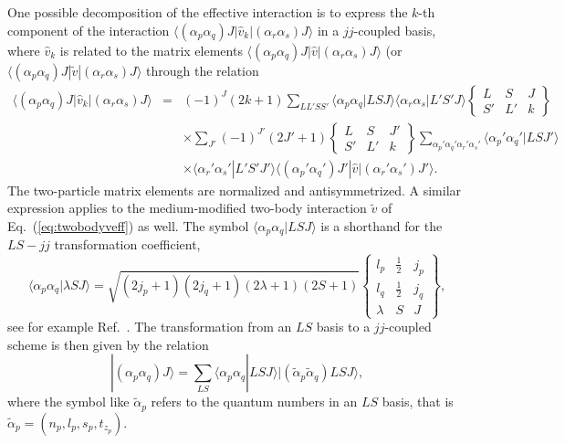 \documentclass[aps,showpacs,floatfix,nofootinbib,preprintnumbers,superscriptaddress,amsmath,amssymb]{revtex4-1}
\begin{document}
One possible decomposition of the effective interaction is to
express the $k$-th component of the interaction $\langle
(\alpha_p\alpha_q)J|\hat{v}_{k}|(\alpha_r\alpha_s)J\rangle $ in a $jj$-coupled basis, where
$\hat{v}_k$ is related to the matrix
elements $\langle (\alpha_p\alpha_q)J|\hat{v}|(\alpha_r\alpha_s)J\rangle $ (or $\langle (\alpha_p\alpha_q)J|\tilde{v}|(\alpha_r\alpha_s)J\rangle $ 
through the relation
\begin{eqnarray}
\langle (\alpha_p\alpha_q)J|\hat{v}_{k}|(\alpha_r\alpha_s)J\rangle&=&(-1)^{J}(2k+1)
\sum_{LL'SS'}\langle
\alpha_p\alpha_q|LSJ\rangle \langle \alpha_r\alpha_s|L'S'J\rangle
\left\{ \begin{array}{ccc}
		       L&S&J\\
		       S'&L'&k
		       \end{array}
		 \right\} \nonumber \\
& &\times \sum_{J'}(-1)^{J'}(2J'+1)\left\{ \begin{array}{ccc}
		       L&S&J'\\
		       S'&L'&k
		       \end{array}
		 \right\}
\sum_{\alpha_{p}'\alpha_{q}'\alpha_{r}'\alpha_{s}'}\langle \alpha_p'\alpha_q'|LSJ'\rangle
\nonumber\\
& &\times \langle \alpha_r'\alpha_s'|L'S'J'\rangle \langle
(\alpha_p'\alpha_q')J'|\hat{v}|(\alpha_r'\alpha_s')J'\rangle .  \label{eq:jj}
\end{eqnarray}
The two-particle matrix elements are normalized and antisymmetrized.
A similar expression applies to the medium-modified two-body interaction $\tilde{v}$ of 
Eq.~(\ref{eq:twobodyveff}) as well.
The symbol $\langle \alpha_p\alpha_q|LSJ \rangle $ is a shorthand
for the $LS-jj$ transformation coefficient,
\[
\langle \alpha_p\alpha_q|\lambda SJ \rangle = \sqrt{(2j_{p}+1)(2j_{q}+1)(2\lambda+1)(2S+1)}
\left\{
\begin{array}{ccc}
       l_{p}&\frac{1}{2}&j_{p}\\
       l_{q}&\frac{1}{2}&j_{q}\\
       \lambda    &S          &J
\end{array}
\right\},
\]
see for example Ref.~\cite{lawson1980}. 
The transformation from an $LS$ basis to a $jj$-coupled scheme is then given by the relation
\[
|(\alpha_p\alpha_q)J\rangle  = \sum_{LS}\langle \alpha_p\alpha_q|LSJ \rangle |(\tilde{\alpha}_p\tilde{\alpha}_q)LSJ\rangle,
\] 
where the symbol like $\tilde{\alpha}_{p}$ refers to the quantum numbers in an $LS$ basis, that is
$\tilde{\alpha}_{p}=(n_{p},l_{p},s_{p},t_{z_{p}})$.
\end{document}
